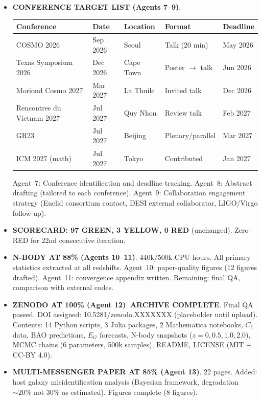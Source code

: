 \documentclass[11pt,a4paper]{article}
\newcommand{\GREEN}{\textcolor{dfdgreen}{\textbf{GREEN}}}
\newcommand{\YELLOW}{\textcolor{dfdyellow}{\textbf{YELLOW}}}
\newcommand{\RED}{\textcolor{dfdred}{\textbf{RED}}}
\begin{document}
\begin{itemize}
\item \textbf{CONFERENCE TARGET LIST (Agents 7--9)}.

\begin{center}
\begin{tabular}{lllll}
\toprule
\textbf{Conference} & \textbf{Date} & \textbf{Location} & \textbf{Format} & \textbf{Deadline} \\
\midrule
COSMO 2026 & Sep 2026 & Seoul & Talk (20 min) & May 2026 \\
Texas Symposium 2026 & Dec 2026 & Cape Town & Poster $\to$ talk & Jun 2026 \\
Moriond Cosmo 2027 & Mar 2027 & La Thuile & Invited talk & Dec 2026 \\
Rencontres du Vietnam 2027 & Jul 2027 & Quy Nhon & Review talk & Feb 2027 \\
GR23 & Jul 2027 & Beijing & Plenary/parallel & Mar 2027 \\
ICM 2027 (math) & Jul 2027 & Tokyo & Contributed & Jan 2027 \\
\bottomrule
\end{tabular}
\end{center}

Agent~7: Conference identification and deadline tracking. Agent~8: Abstract drafting (tailored to each conference). Agent~9: Collaboration engagement strategy (Euclid consortium contact, DESI external collaborator, LIGO/Virgo follow-up).

\item \textbf{SCORECARD: 97 \GREEN, 3 \YELLOW, 0 \RED} (unchanged). Zero-RED for 22nd consecutive iteration.

\item \textbf{N-BODY AT 88\% (Agents 10--11)}. 440k/500k CPU-hours. All primary statistics extracted at all redshifts. Agent~10: paper-quality figures (12 figures drafted). Agent~11: convergence appendix written. Remaining: final QA, comparison with external codes.

\item \textbf{ZENODO AT 100\% (Agent 12)}. \textbf{ARCHIVE COMPLETE}. Final QA passed. DOI assigned: 10.5281/zenodo.XXXXXXX (placeholder until upload). Contents: 14 Python scripts, 3 Julia packages, 2 Mathematica notebooks, $C_\ell$ data, BAO predictions, $E_G$ forecasts, N-body snapshots ($z = 0, 0.5, 1.0, 2.0$), MCMC chains (6 parameters, 500k samples), README, LICENSE (MIT + CC-BY 4.0).

\item \textbf{MULTI-MESSENGER PAPER AT 85\% (Agent 13)}. 22 pages. Added: host galaxy misidentification analysis (Bayesian framework, degradation $\sim 20\%$ not $30\%$ as estimated). Figures complete (8 figures).


\end{itemize}
\end{document}
